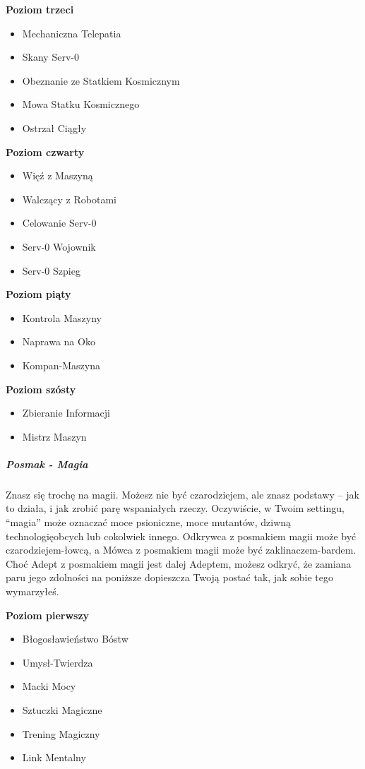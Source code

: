 \textbf{Poziom trzeci}
\begin{itemize}
\item Mechaniczna Telepatia
\item Skany Serv-0
\item Obeznanie ze Statkiem Kosmicznym
\item Mowa Statku Kosmicznego
\item Ostrzał Ciągły
\end{itemize}

\textbf{Poziom czwarty}
\begin{itemize}
\item Więź z Maszyną
\item Walczący z Robotami
\item Celowanie Serv-0
\item Serv-0 Wojownik
\item Serv-0 Szpieg 
\end{itemize}

\textbf{Poziom piąty}
\begin{itemize}
\item Kontrola Maszyny
\item Naprawa na Oko
\item Kompan-Maszyna
\end{itemize}

\textbf{Poziom szósty}
\begin{itemize}
\item Zbieranie Informacji
\item Mistrz Maszyn 
\end{itemize}

\subparagraph{Posmak - Magia}

Znasz się trochę na magii. Możesz nie być czarodziejem, ale znasz podstawy – jak to działa, i jak zrobić parę wspaniałych rzeczy. Oczywiście, w Twoim settingu, “magia” może oznaczać moce psioniczne, moce mutantów, dziwną technologięobcych lub cokolwiek innego. Odkrywca z posmakiem magii może być czarodziejem-łowcą, a Mówca z posmakiem magii może być zaklinaczem-bardem. Choć Adept z posmakiem magii jest dalej Adeptem, możesz odkryć, że zamiana paru jego zdolności na poniższe dopieszcza Twoją postać tak, jak sobie tego wymarzyłeś. 

\textbf{Poziom pierwszy}
\begin{itemize}
\item Błogosławieństwo Bóstw
\item Umysł-Twierdza
\item Macki Mocy
\item Sztuczki Magiczne
\item Trening Magiczny
\item Link Mentalny
\end{itemize}

